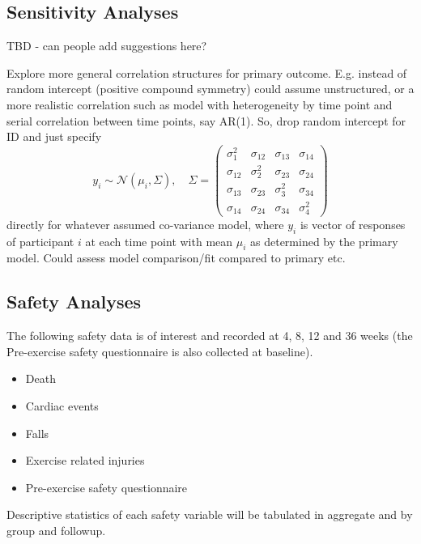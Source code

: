 \documentclass[
]{article}
\begin{document}
\hypertarget{sensitivity-analyses}{%
  \subsection{Sensitivity Analyses}\label{sensitivity-analyses}}

TBD - can people add suggestions here?

Explore more general correlation structures for primary outcome.
E.g. instead of random intercept (positive compound symmetry) could assume unstructured, or a more realistic correlation such as model with heterogeneity by time point and serial correlation between time points, say AR(1). So, drop random intercept for ID and just specify
$$
  y_i \sim \mathcal{N}(\mu_i, \Sigma),\quad
  \Sigma = \begin{pmatrix}
    \sigma_{1}^2 & \sigma_{12} & \sigma_{13} & \sigma_{14}  \\
    \sigma_{12}  & \sigma_2^2  & \sigma_{23} & \sigma_{24}  \\
    \sigma_{13}  & \sigma_{23} & \sigma_3^2  & \sigma_{34}  \\
    \sigma_{14}  & \sigma_{24} & \sigma_{34} & \sigma_{4}^2
  \end{pmatrix}
$$
directly for whatever assumed co-variance model, where $y_i$ is vector of responses of participant $i$ at each time point with mean $\mu_i$ as determined by the primary model. Could assess model comparison/fit compared to primary etc.

\hypertarget{safety-analyses}{%
  \subsection{Safety Analyses}\label{safety-analyses}}

The following safety data is of interest and recorded at 4, 8, 12 and 36 weeks (the Pre-exercise safety questionnaire is also collected at baseline).

\begin{itemize}
  \item Death
  \item Cardiac events
  \item Falls
  \item Exercise related injuries
  \item Pre-exercise safety questionnaire
\end{itemize}

Descriptive statistics of each safety variable will be tabulated in aggregate and by group and followup.
\end{document}
